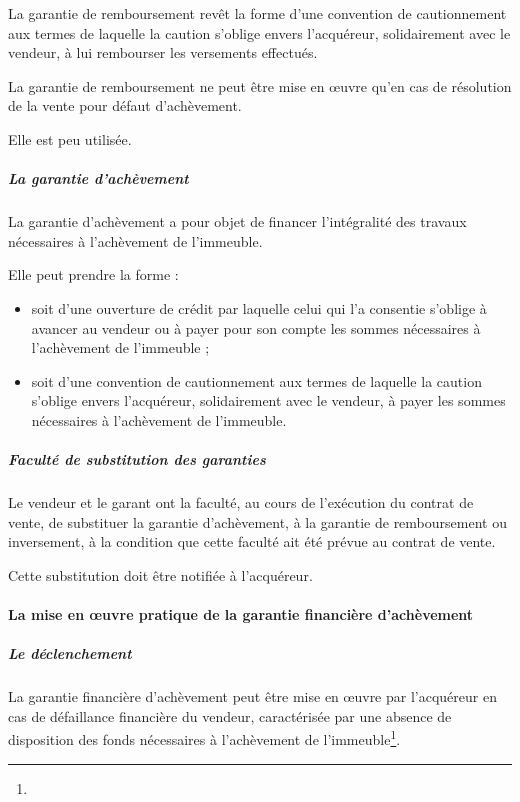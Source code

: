 				La garantie de remboursement revêt la forme d'une convention de cautionnement aux termes de laquelle la caution s'oblige envers l'acquéreur, solidairement avec le vendeur, à lui rembourser les versements effectués.

				La garantie de remboursement ne peut être mise en œuvre qu’en cas de résolution de la vente pour défaut d’achèvement.

				Elle est peu utilisée.

				\subparagraph{La garantie d’achèvement} 

				La garantie d’achèvement a pour objet de financer l’intégralité des travaux nécessaires à l’achèvement de l’immeuble.

				\medbreak Elle peut prendre la forme :
				\begin{itemize}
					\item soit d'une ouverture de crédit par laquelle celui qui l'a consentie s'oblige à avancer au vendeur ou à payer pour son compte les sommes nécessaires à l'achèvement de l'immeuble ;

					\item soit d'une convention de cautionnement aux termes de laquelle la caution s'oblige envers l'acquéreur, solidairement avec le vendeur, à payer les sommes nécessaires à l'achèvement de l'immeuble.
				\end{itemize}


				\subparagraph{Faculté de substitution des garanties}

				Le vendeur et le garant ont la faculté, au cours de l'exécution du contrat de vente, de substituer la garantie d'achèvement, à la garantie de remboursement ou inversement, à la condition que cette faculté ait été prévue au contrat de vente.

				Cette substitution doit être notifiée à l'acquéreur.


			\paragraph{La mise en œuvre pratique de la garantie financière d’achèvement}

				\subparagraph{Le déclenchement}

				La garantie financière d'achèvement peut être mise en œuvre par l'acquéreur en cas de défaillance financière du vendeur, caractérisée par une absence de disposition des fonds nécessaires à l'achèvement de l'immeuble\footnote{}.

